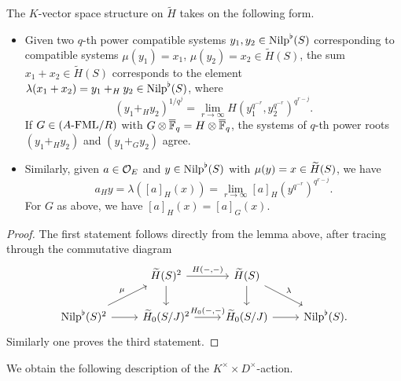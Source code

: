 \documentclass[../main.tex]{subfiles}
\begin{document}
\begin{lem}\label{lem:GroupStructureOnNilp}
  The $K$-vector space structure on $\tilde H$ takes on the following form.
  \begin{itemize}
    \item Given two $q$-th power compatible systems $y_1, y_2
      \in \Nilp^\flat(S)$ corresponding to compatible systems
      $\mu(y_1) = x_1$, $\mu(y_2) = x_2 \in \tilde H(S)$, the sum $x_1 + x_2 \in
      \tilde H(S)$ corresponds to the element $\lambda(x_1 + x_2) = y_1 +_H y_2 \in
      \Nilp^\flat(S)$, where 
      \begin{equation*}
        (y_1 +_H y_2)^{1/q^j} = \lim_{r \to \infty} H( y_1^{q^{-r}},
        y_2^{q^{-r}})^{q^{r-j}}.
      \end{equation*}
      If $G \in \FMLOver AR$ with $G \otimes \Fqbar = H \otimes \Fqbar$,
      the systems of $q$-th power roots $(y_1 +_H y_2)$ and $(y_1 +_G y_2)$ agree. 
    \item Similarly, given $a \in \cO_E$ and $y \in \Nilp^\flat(S)$ with
      $\mu(y) = x \in \Tilde H(S)$, we have 
      \begin{equation*}
        a_H y = \lambda([a]_H(x)) = \lim_{r \to \infty} [a]_H(y^{q^{-r}})^{q^{r-j}}.
      \end{equation*}
      For $G$ as above, we have $[a]_H(x) = [a]_G(x)$. 
  \end{itemize}
\begin{proof}
  The first statement follows directly from the lemma above, after tracing
  through the commutative diagram
  \begin{equation*}
    \begin{tikzcd}[ampersand replacement=\&]
    	\& {\Tilde H(S)^2} \& {\Tilde H(S)} \\
    	{\Nilp^\flat(S)^2} \& {\Tilde H_0(S/J)^2} \& {\Tilde H_0(S/J)} \& {\Nilp^\flat(S).}
    	\arrow["{H(-,-)}", from=1-2, to=1-3]
    	\arrow[ from=1-2, to=2-2]
    	\arrow[ from=1-3, to=2-3]
    	\arrow["\lambda", from=1-3, to=2-4]
    	\arrow["\mu", from=2-1, to=1-2]
    	\arrow[ from=2-1, to=2-2]
    	\arrow["{H_0(-,-)}", from=2-2, to=2-3]
    	\arrow[from=2-3, to=2-4]
    \end{tikzcd}
  \end{equation*}
  Similarly one proves the third statement.
\end{proof}
\end{lem}

We obtain the following description of the $K^\times \times D^\times$-action.
\end{document}
